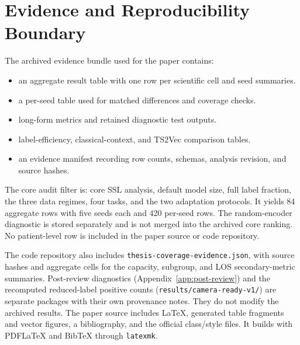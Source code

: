 \section{Evidence and Reproducibility Boundary}
\label{app:reproducibility}

The archived evidence bundle used for the paper contains:
\begin{itemize}
  \item an aggregate result table with one row per scientific cell and seed summaries.
  \item a per-seed table used for matched differences and coverage checks.
  \item long-form metrics and retained diagnostic test outputs.
  \item label-efficiency, classical-context, and TS2Vec comparison tables.
  \item an evidence manifest recording row counts, schemas, analysis revision, and source hashes.
\end{itemize}

The core audit filter is: core SSL analysis, default model size, full label fraction, the three data regimes, four tasks, and the two adaptation protocols. It yields 84 aggregate rows with five seeds each and 420 per-seed rows. The random-encoder diagnostic is stored separately and is not merged into the archived core ranking. No patient-level row is included in the paper source or code repository.

The code repository also includes \texttt{thesis-coverage-evidence.json}, with source hashes and aggregate cells for the capacity, subgroup, and LOS secondary-metric summaries. Post-review diagnostics (Appendix~\ref{app:post-review}) and the recomputed reduced-label positive counts (\texttt{results/camera-ready-v1/}) are separate packages with their own provenance notes. They do not modify the archived results. The paper source includes LaTeX, generated table fragments and vector figures, a bibliography, and the official class/style files. It builds with PDF\LaTeX{} and BibTeX through \texttt{latexmk}.
